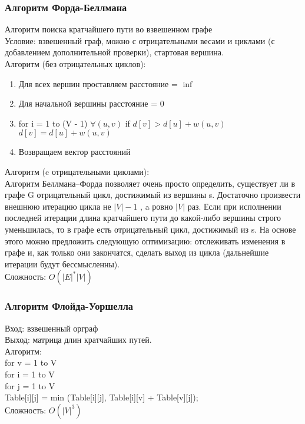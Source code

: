 \documentclass[a4paper]{article}
\begin{document}
\subsubsection{Алгоритм Форда-Беллмана}
Алгоритм поиска кратчайшего пути во взвешенном графе\\
Условие: взвешенный граф, можно с отрицательными весами и циклами (с добавлением дополнительной проверки), стартовая вершина.\\
Алгоритм (без отрицательных циклов):
\begin{enumerate}
	\item Для всех вершин проставляем расстояние = $\inf$
	\item Для начальной вершины расстояние = 0
	\item for i = 1 to (V - 1)
			$\forall (u ,v)$
				if $d[v] >  d[u] + w(u,v)$
					$d[v] = d[u] + w(u,v)$
	\item Возвращаем вектор расстояний
\end{enumerate}
Алгоритм (c отрицательными циклами):\\
Алгоритм Беллмана–Форда позволяет очень просто определить, существует ли в графе G отрицательный цикл, достижимый из вершины s. Достаточно произвести внешнюю итерацию цикла не $|V|-1$ , a ровно $|V|$ раз. Если при исполнении последней итерации длина кратчайшего пути до какой-либо вершины строго уменьшилась, то в графе есть отрицательный цикл, достижимый из s. На основе этого можно предложить следующую оптимизацию: отслеживать изменения в графе и, как только они закончатся, сделать выход из цикла (дальнейшие итерации будут бессмысленны).\\
Сложность: $O(|E|^*|V|)$

\subsubsection{Алгоритм Флойда-Уоршелла}
Вход: взвешенный орграф\\
Выход: матрица длин кратчайших путей.\\
Алгоритм:\\
for v = 1 to V\\
	for i = 1 to V\\
		for j = 1 to V\\
			Table[i][j] = min (Table[i][j], Table[i][v] + Table[v][j]); \\
Сложность: $O(|V|^3)$
\end{document}
